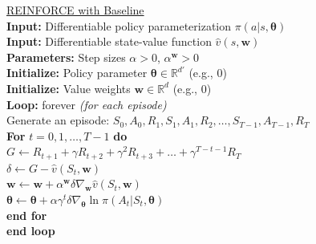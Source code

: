 \documentclass{article}
\begin{document}
\begin{tcolorbox}[arc=0mm,width=(\linewidth - 0.2cm)] 
	\begin{tabbing}
		{\sc \underline{REINFORCE with Baseline}}\\
    \textbf{Input:} Differentiable policy parameterization $\pi(a | s,\bm{\theta})$ \\
    \textbf{Input:} Differentiable state-value function $\hat v(s,\bm{w})$ \\
    \textbf{Parameters:} Step sizes $\alpha > 0$, $\alpha^{\bm{w}} > 0$ \\
        \textbf{Initialize:} Policy parameter $\bm{\theta} \in \mathbb{R}^{d'}$ (e.g., $0$) \\
        \textbf{Initialize:} Value weights $\bm{w} \in \mathbb{R}^d$ (e.g., $0$) \\
        \textbf{Loop:} forever \textit{(for each episode)} \\
        \hspace{0.5cm} Generate an episode: $S_0, A_0, R_1, S_1, A_1, R_2, \dots, S_{T-1}, A_{T-1}, R_T$ \\
        \hspace{0.5cm} \textbf{For} $t = 0, 1, \dots, T-1$ \textbf{do} \\
        \hspace{1.0cm} $G \gets R_{t+1} + \gamma R_{t+2} + \gamma^2 R_{t+3} + \dots + \gamma^{T-t-1} R_T$ \\
        \hspace{1.0cm} $\delta \gets G - \hat v(S_t,\bm{w})$ \\
        \hspace{1.0cm} $\bm{w} \gets \bm{w} + \alpha^{\bm{w}} \delta \nabla_{\bm{w}} \hat v(S_t,\bm{w})$ \\
        \hspace{1.0cm} $\bm{\theta} \gets \bm{\theta} + \alpha \gamma^t \delta \nabla_{\bm{\theta}} \ln \pi(A_t | S_t,\bm{\theta})$ \\
        \hspace{0.5cm} \textbf{end for} \\
        \textbf{end loop} \\
    
	\end{tabbing}
\end{tcolorbox}
\end{document}
